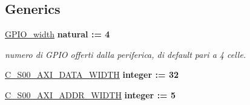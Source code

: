 \subsection*{Generics}
 \begin{DoxyCompactItemize}
\item 
\hypertarget{group___a_x_i-device_ga0b52ca75e9a6093b2b60d5e851803069}{\hyperlink{group___a_x_i-device_ga0b52ca75e9a6093b2b60d5e851803069}{G\+P\+I\+O\+\_\+width} {\bfseries {\bfseries \textcolor{vhdlchar}{natural}\textcolor{vhdlchar}{ }\textcolor{vhdlchar}{ }\textcolor{vhdlchar}{\+:}\textcolor{vhdlchar}{=}\textcolor{vhdlchar}{ }\textcolor{vhdlchar}{ } \textcolor{vhdldigit}{4} \textcolor{vhdlchar}{ }}}}\label{group___a_x_i-device_ga0b52ca75e9a6093b2b60d5e851803069}

\begin{DoxyCompactList}\small\item\em numero di G\+P\+I\+O offerti dalla periferica, di default pari a 4 celle. \end{DoxyCompactList}\item 
\hypertarget{group___a_x_i-device_gafce7943994a4ddfa81f224225976a4c7}{\hyperlink{group___a_x_i-device_gafce7943994a4ddfa81f224225976a4c7}{C\+\_\+\+S00\+\_\+\+A\+X\+I\+\_\+\+D\+A\+T\+A\+\_\+\+W\+I\+D\+T\+H} {\bfseries {\bfseries \textcolor{vhdlchar}{integer}\textcolor{vhdlchar}{ }\textcolor{vhdlchar}{ }\textcolor{vhdlchar}{\+:}\textcolor{vhdlchar}{=}\textcolor{vhdlchar}{ }\textcolor{vhdlchar}{ } \textcolor{vhdldigit}{32} \textcolor{vhdlchar}{ }}}}\label{group___a_x_i-device_gafce7943994a4ddfa81f224225976a4c7}

\begin{DoxyCompactList}\small\item\em \end{DoxyCompactList}\item 
\hypertarget{group___a_x_i-device_gab7787f274c76bb896ac98fdcfb570c65}{\hyperlink{group___a_x_i-device_gab7787f274c76bb896ac98fdcfb570c65}{C\+\_\+\+S00\+\_\+\+A\+X\+I\+\_\+\+A\+D\+D\+R\+\_\+\+W\+I\+D\+T\+H} {\bfseries {\bfseries \textcolor{vhdlchar}{integer}\textcolor{vhdlchar}{ }\textcolor{vhdlchar}{ }\textcolor{vhdlchar}{\+:}\textcolor{vhdlchar}{=}\textcolor{vhdlchar}{ }\textcolor{vhdlchar}{ } \textcolor{vhdldigit}{5} \textcolor{vhdlchar}{ }}}}\label{group___a_x_i-device_gab7787f274c76bb896ac98fdcfb570c65}

\begin{DoxyCompactList}\small\item\em \end{DoxyCompactList}\end{DoxyCompactItemize}
